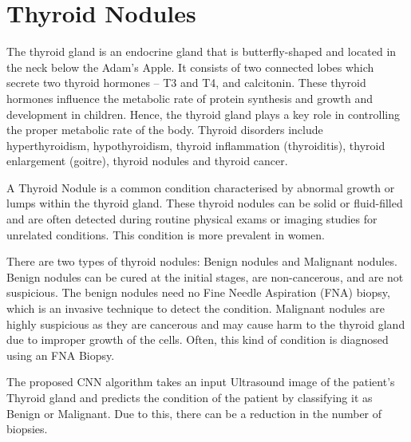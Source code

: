 \section{Thyroid Nodules}
\justifying
    \noindent
    The thyroid gland is an endocrine gland that is butterfly-shaped and located in the neck below the Adam’s Apple. It consists of two connected lobes which secrete two thyroid hormones – T3 and T4, and calcitonin. These thyroid hormones influence the metabolic rate of protein synthesis and growth and development in children. Hence, the thyroid gland plays a key role in controlling the proper metabolic rate of the body. Thyroid disorders include hyperthyroidism, hypothyroidism, thyroid inflammation (thyroiditis), thyroid enlargement (goitre), thyroid nodules and thyroid cancer. \par \noindent
    A Thyroid Nodule is a common condition characterised by abnormal growth or lumps within the thyroid gland. These thyroid nodules can be solid or fluid-filled and are often detected during routine physical exams or imaging studies for unrelated conditions. This condition is more prevalent in women. \par \noindent
    There are two types of thyroid nodules: Benign nodules and Malignant nodules. Benign nodules can be cured at the initial stages, are non-cancerous, and are not suspicious. The benign nodules need no Fine Needle Aspiration (FNA) biopsy, which is an invasive technique to detect the condition. Malignant nodules are highly suspicious as they are cancerous and may cause harm to the thyroid gland due to improper growth of the cells. Often, this kind of condition is diagnosed using an FNA Biopsy. 
    \par \noindent The proposed CNN algorithm takes an input Ultrasound image of the patient's Thyroid gland and predicts the condition of the patient by classifying it as Benign or Malignant. Due to this, there can be a reduction in the number of biopsies.  



